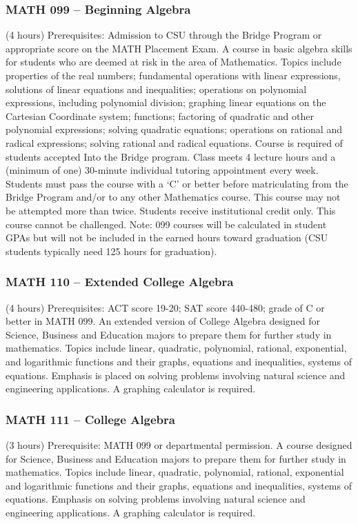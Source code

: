 \subsubsection{MATH 099 -- Beginning Algebra}
(4 hours) Prerequisites: Admission to CSU through the Bridge Program or appropriate score on the MATH Placement Exam. A course in basic algebra skills for students who are deemed at risk in the area of Mathematics. Topics include properties of the real numbers; fundamental operations with linear expressions, solutions of linear equations and inequalities; operations on polynomial expressions, including polynomial division; graphing linear equations on the Cartesian Coordinate system; functions; factoring of quadratic and other polynomial expressions; solving quadratic equations; operations on rational and radical expressions; solving rational and radical equations. Course is required of students accepted Into the Bridge program. Class meets 4 lecture hours and a (minimum of one) 30-minute individual tutoring appointment every week. Students must pass the course with a ‘C’ or better before matriculating from the Bridge Program and/or to any other Mathematics course. This course may not be attempted more than twice. Students receive institutional credit only. This course cannot be challenged. Note: 099 courses will be calculated in student GPAs but will not be included in the earned hours toward graduation (CSU students typically need 125 hours for graduation).

\subsubsection{MATH 110 -- Extended College Algebra}
(4 hours) Prerequisites: ACT score 19-20; SAT score 440-480; grade of C or better in MATH 099. An extended version of College Algebra designed for Science, Business and Education majors to prepare them for further study in mathematics. Topics include linear, quadratic, polynomial, rational, exponential, and logarithmic functions and their graphs, equations and inequalities, systems of equations. Emphasis is placed on solving problems involving natural science and engineering applications. A graphing calculator is required.

\subsubsection{MATH 111 -- College Algebra}
(3 hours) Prerequisite: MATH 099 or departmental permission. A course designed for Science, Business and Education majors to prepare them for further study in mathematics. Topics include linear, quadratic, polynomial, rational, exponential and logarithmic functions and their graphs, equations and inequalities, systems of equations. Emphasis on solving problems involving natural science and engineering applications. A graphing calculator is required.

